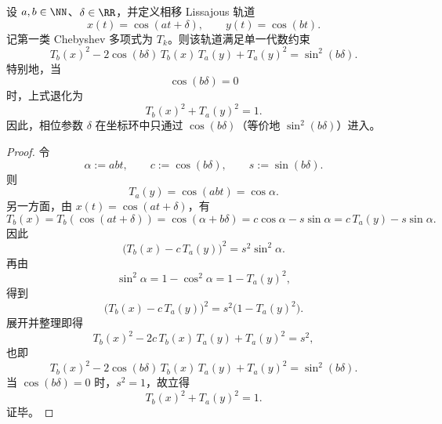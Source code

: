 \begin{theorem}\label{thm:xi-time-part62d-lissajous-chebyshev-implicit-equation}
设 \(a,b\in\NN\)、\(\delta\in\RR\)，并定义相移 Lissajous 轨道
\[
x(t)=\cos(at+\delta),
\qquad
y(t)=\cos(bt).
\]
记第一类 Chebyshev 多项式为 \(T_k\)。则该轨道满足单一代数约束
\[
\boxed{\;
T_b(x)^2
-2\cos(b\delta)\,T_b(x)\,T_a(y)
+T_a(y)^2
=
\sin^2(b\delta).\;}
\]
特别地，当
\[
\cos(b\delta)=0
\]
时，上式退化为
\[
\boxed{\;
T_b(x)^2+T_a(y)^2=1.\;}
\]
因此，相位参数 \(\delta\) 在坐标环中只通过 \(\cos(b\delta)\)（等价地 \(\sin^2(b\delta)\)）进入。
\end{theorem}
\begin{proof}
令
\[
\alpha:=abt,
\qquad
c:=\cos(b\delta),
\qquad
s:=\sin(b\delta).
\]
则
\[
T_a(y)=\cos(abt)=\cos\alpha.
\]
另一方面，由 \(x(t)=\cos(at+\delta)\)，有
\[
T_b(x)=T_b(\cos(at+\delta))
=
\cos(\alpha+b\delta)
=
c\cos\alpha-s\sin\alpha
=
c\,T_a(y)-s\sin\alpha.
\]
因此
\[
\bigl(T_b(x)-c\,T_a(y)\bigr)^2=s^2\sin^2\alpha.
\]
再由
\[
\sin^2\alpha=1-\cos^2\alpha=1-T_a(y)^2,
\]
得到
\[
\bigl(T_b(x)-c\,T_a(y)\bigr)^2
=
s^2\bigl(1-T_a(y)^2\bigr).
\]
展开并整理即得
\[
T_b(x)^2-2c\,T_b(x)\,T_a(y)+T_a(y)^2=s^2,
\]
也即
\[
T_b(x)^2
-2\cos(b\delta)\,T_b(x)\,T_a(y)
+T_a(y)^2
=
\sin^2(b\delta).
\]
当 \(\cos(b\delta)=0\) 时，\(s^2=1\)，故立得
\[
T_b(x)^2+T_a(y)^2=1.
\]
证毕。
\end{proof}

